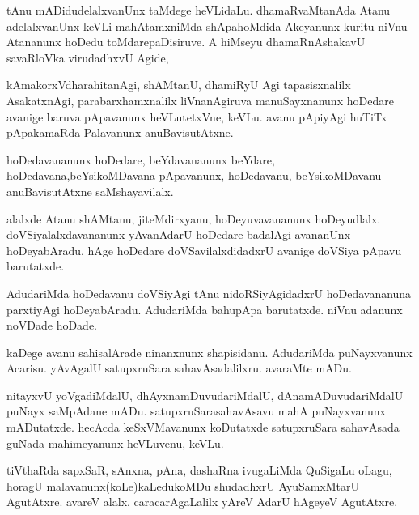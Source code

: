 \documentclass{article}
\begin{document}
\begin{mn}
tAnu mADidudelalxvanUnx taMdege heVLidaLu. dhamaRvaMtanAda  Atanu adelalxvanUnx  
keVLi mahAtamxniMda shApahoMdida Akeyanunx kuritu niVnu Atananunx hoDedu 
toMdarepaDisiruve. A hiMseyu dhamaRnAshakavU savaRloVka virudadhxvU Agide,
\end{mn}

\begin{mn}
kAmakorxVdharahitanAgi, shAMtanU, dhamiRyU Agi tapasisxnalilx AsakatxnAgi, 
parabarxhamxnalilx liVnanAgiruva manuSayxnanunx hoDedare avanige baruva pApavanunx 
heVLutetxVne, keVLu. avanu pApiyAgi huTiTx pApakamaRda Palavanunx anuBavisutAtxne. 
\end{mn}

\begin{mn}
hoDedavananunx hoDedare, beYdavananunx beYdare, hoDedavana,beYsikoMDavana 
pApavanunx, hoDedavanu, beYsikoMDavanu anuBavisutAtxne saMshayavilalx.
\end{mn}

\begin{mn}
alalxde Atanu shAMtanu, jiteMdirxyanu, hoDeyuvavananunx hoDeyudlalx. 
doVSiyalalxdavananunx yAvanAdarU hoDedare badalAgi avananUnx hoDeyabAradu.  
hAge hoDedare doVSavilalxdidadxrU avanige doVSiya pApavu barutatxde.  
\end{mn}

\begin{mn}
AdudariMda hoDedavanu doVSiyAgi tAnu nidoRSiyAgidadxrU hoDedavananuna 
parxtiyAgi hoDeyabAradu. AdudariMda bahupApa barutatxde. niVnu adanunx noVDade hoDade.
\end{mn}

\begin{mn}
kaDege avanu sahisalArade ninanxnunx shapisidanu.  AdudariMda puNayxvanunx Acarisu.  
yAvAgalU satupxruSara sahavAsadalilxru.  avaraMte mADu.
\end{mn}

\begin{mn}
nitayxvU yoVgadiMdalU, dhAyxnamDuvudariMdalU, dAnamADuvudariMdalU  puNayx 
saMpAdane mADu. satupxruSarasahavAsavu mahA puNayxvanunx mADutatxde. hecAcda 
keSxVMavanunx koDutatxde  satupxruSara sahavAsada guNada mahimeyanunx heVLuvenu, keVLu.
\end{mn}

\begin{mn}
tiVthaRda sapxSaR, sAnxna, pAna, dashaRna ivugaLiMda QuSigaLu oLagu, horagU 
malavanunx(koLe)kaLedukoMDu shudadhxrU AyuSamxMtarU AgutAtxre.  avareV alalx.  
caracarAgaLalilx  yAreV  AdarU hAgeyeV AgutAtxre.
\end{mn}
\end{document}
